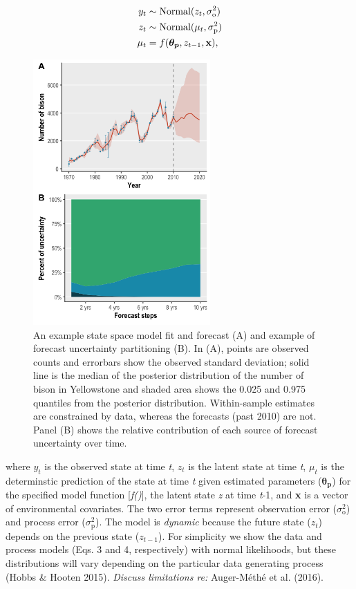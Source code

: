 \documentclass[12pt,]{article}
\begin{document}
\begin{align}
y_t &\sim \text{Normal}(z_t, \sigma^2_{\text{o}}) \\
z_t &\sim \text{Normal}(\mu_t, \sigma^2_{\text{p}}) \\
\mu_t &= f(\boldsymbol{\theta_p},z_{t-1},\bold{x}),
\end{align}

\begin{figure}
  \centering
     \includegraphics[height=4in]{../figures/bison_combined.png}
  \caption{An example state space model fit and forecast (A) and example of forecast uncertainty partitioning (B). In (A), points are observed counts and errorbars show the observed standard deviation; solid line is the median of the posterior distribution of the number of bison in Yellowstone and shaded area shows the 0.025 and 0.975 quantiles from the posterior distribution. Within-sample estimates are constrained by data, whereas the forecasts (past 2010) are not. Panel (B) shows the relative contribution of each source of forecast uncertainty over time.}
\end{figure}

where \(y_t\) is the observed state at time \emph{t}, \(z_t\) is the
latent state at time \emph{t}, \(\mu_t\) is the determinstic prediction
of the state at time \emph{t} given estimated parameters
(\(\boldsymbol{\theta_p}\)) for the specified model function
{[}\emph{f()}{]}, the latent state \emph{z} at time \emph{t}-1, and
\textbf{x} is a vector of environmental covariates. The two error terms
represent observation error (\(\sigma^2_{\text{o}}\)) and process error
(\(\sigma^2_{\text{p}}\)). The model is \emph{dynamic} because the
future state (\(z_t\)) depends on the previous state (\(z_{t-1}\)). For
simplicity we show the data and process models (Eqs. 3 and 4,
respectively) with normal likelihoods, but these distributions will vary
depending on the particular data generating process (Hobbs \& Hooten
2015). \emph{Discuss limitations re:} Auger-Méthé et al. (2016).
\end{document}
